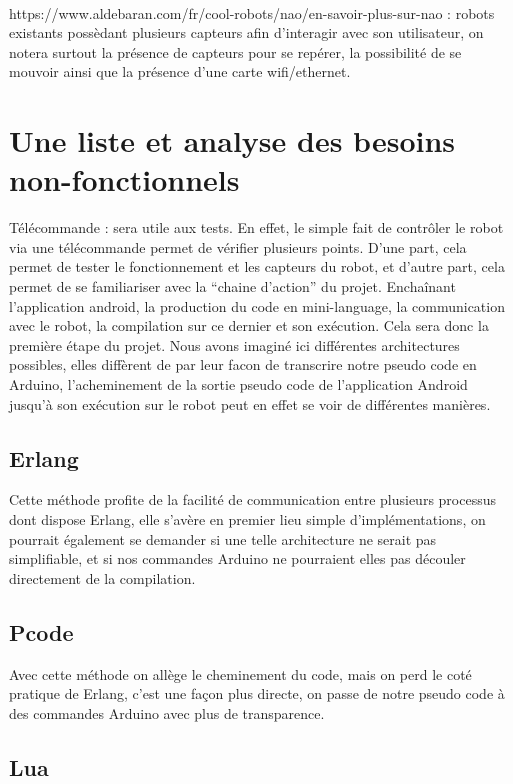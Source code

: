 \documentclass[a4paper]{article}
\begin{document}
\paragraph{}
https://www.aldebaran.com/fr/cool-robots/nao/en-savoir-plus-sur-nao : robots existants possèdant plusieurs capteurs afin d’interagir avec son utilisateur, on notera surtout la présence de capteurs pour se repérer, la possibilité de se mouvoir ainsi que la présence d’une carte wifi/ethernet.

\section{Une liste et analyse des besoins non-fonctionnels}
Télécommande : sera utile aux tests. En effet, le simple fait de contrôler le robot via une télécommande permet de vérifier plusieurs points. D’une part, cela permet de tester le fonctionnement et les capteurs du robot, et d’autre part, cela permet de se familiariser avec la “chaine d’action” du projet. Enchaînant l’application android, la production du code en mini-language, la communication avec le robot, la compilation sur ce dernier et son exécution. Cela sera donc la première étape du projet.
Nous avons imaginé ici différentes architectures possibles, elles diffèrent de par leur facon de transcrire notre pseudo code en Arduino, l’acheminement de la sortie pseudo code de l’application Android jusqu'à son exécution sur le robot peut en effet se voir de différentes manières.

\subsection{Erlang}
Cette méthode profite de la facilité de communication entre plusieurs processus dont dispose Erlang, elle s’avère en premier lieu simple d’implémentations, on pourrait également se demander si une telle architecture ne serait pas simplifiable, et si nos commandes Arduino ne pourraient elles pas découler directement de la compilation.

\subsection{Pcode}
Avec cette méthode on allège le cheminement du code, mais on perd le coté pratique de Erlang, c’est une façon plus directe, on passe de notre pseudo code à des commandes Arduino avec plus de transparence.

\subsection{Lua}
\end{document}

